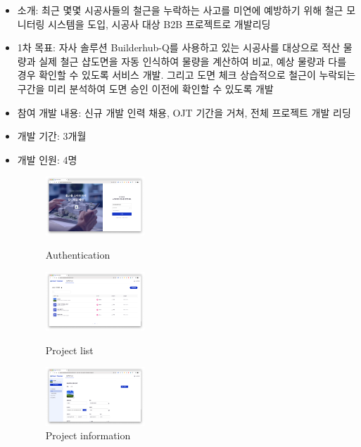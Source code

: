 \label{smartchecker}

\begin{itemize}[label=]
	\item 소개: 최근 몇몇 시공사들의 철근을 누락하는 사고를 미연에 예방하기 위해 철근 모니터링 시스템을 도입, 시공사 대상 B2B 프로젝트로 개발리딩
	\item 1차 목표: 자사 솔루션 Builderhub-Q를 사용하고 있는 시공사를 대상으로 적산 물량과 실제 철근 샵도면을 자동 인식하여 물량을 계산하여 비교, 예상 물량과 다를 경우 확인할 수 있도록 서비스 개발. 그리고 도면 체크 상습적으로 철근이 누락되는 구간을 미리 분석하여 도면 승인 이전에 확인할 수 있도록 개발
	\item 참여 개발 내용: 신규 개발 인력 채용, OJT 기간을 거쳐, 전체 프로젝트 개발 리딩
	\item 개발 기간: 3개월
	\item 개발 인원: 4명
	      \begin{figure}[!ht]
		      \begin{fullwidth}
			      \parbox{0.35\textwidth}{
				      \centering
				      \includegraphics[width=0.35\textwidth]{images/smart-checker-auth.png}
				      \caption*{Authentication}
			      }\qquad
			      \parbox{0.35\textwidth}{
				      \centering
				      \includegraphics[width=0.35\textwidth]{images/smart-checker-project-list.png}
				      \caption*{Project list}
			      }\qquad
			      \parbox{0.35\textwidth}{
				      \centering
				      \includegraphics[width=0.35\textwidth]{images/smart-checker-project-info.png}
				      \caption*{Project information}
			      }\qquad
			      \parbox{0.35\textwidth}{
}
\end{fullwidth}
\end{figure}
\end{itemize}
